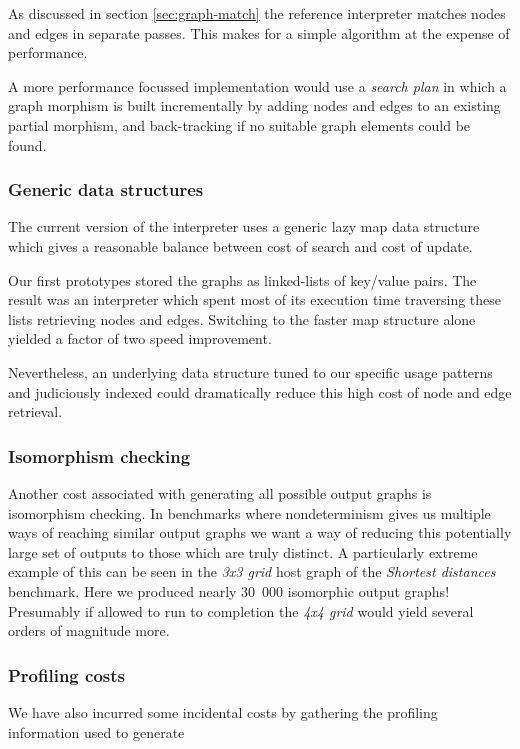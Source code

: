 As discussed in section \ref{sec:graph-match} the reference interpreter matches nodes and edges in separate passes. This makes for a simple algorithm at the expense of performance.

A more performance focussed implementation would use a \textit{search plan}\cite{Horvath-Varro07} in which a graph morphism is built incrementally by adding nodes and edges to an existing partial morphism, and back-tracking if no suitable graph elements could be found.


\subsubsection*{Generic data structures}

The current version of the interpreter uses a generic lazy map data structure which gives a reasonable balance between cost of search and cost of update. 


Our first prototypes stored the graphs as linked-lists of key/value pairs. The result was an interpreter which spent most of its execution time traversing these lists retrieving nodes and edges. Switching to the faster map structure alone yielded a factor of two speed improvement.

Nevertheless, an underlying data structure tuned to our specific usage patterns and judiciously indexed could dramatically reduce this high cost of node and edge retrieval.


\subsubsection*{Isomorphism checking}

Another cost associated with generating all possible output graphs is isomorphism checking. In benchmarks where nondeterminism gives us multiple ways of reaching similar output graphs we want a way of reducing this potentially large set of outputs to those which are truly distinct. A particularly extreme example of this can be seen in the \textit{3x3 grid} host graph of the \textit{Shortest distances} benchmark. Here we produced nearly 30~000 isomorphic output graphs! Presumably if allowed to run to completion the \textit{4x4 grid} would yield several orders of magnitude more.


\subsubsection*{Profiling costs}

We have also incurred some incidental costs by gathering the profiling information used to generate 




